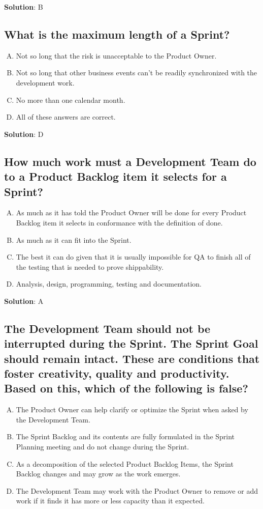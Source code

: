 \textbf{Solution}: B


\subsection{What is the maximum length of a Sprint?}
\begin{enumerate}[A)]
  \item Not so long that the risk is unacceptable to the Product Owner.
  \item Not so long that other business events can't be readily synchronized with the development work.
  \item No more than one calendar month.
  \item All of these answers are correct.
\end{enumerate}


\textbf{Solution}: D


\subsection{How much work must a Development Team do to a Product Backlog item it selects for a Sprint?}
\begin{enumerate}[A)]
  \item As much as it has told the Product Owner will be done for every Product Backlog item it selects in conformance with the definition of done.
  \item As much as it can fit into the Sprint.
  \item The best it can do given that it is usually impossible for QA to finish all of the testing that is needed to prove shippability.
  \item Analysis, design, programming, testing and documentation.
\end{enumerate}


\textbf{Solution}: A


\subsection{The Development Team should not be interrupted during the Sprint. The Sprint Goal should remain intact. These are conditions that foster creativity, quality and productivity. Based on this, which of the following is false?}
\begin{enumerate}[A)]
  \item The Product Owner can help clarify or optimize the Sprint when asked by the Development Team.
  \item The Sprint Backlog and its contents are fully formulated in the Sprint Planning meeting and do not change during the Sprint.
  \item As a decomposition of the selected Product Backlog Items, the Sprint Backlog changes and may grow as the work emerges.
  \item The Development Team may work with the Product Owner to remove or add work if it finds it has more or less capacity than it expected.
\end{enumerate}


